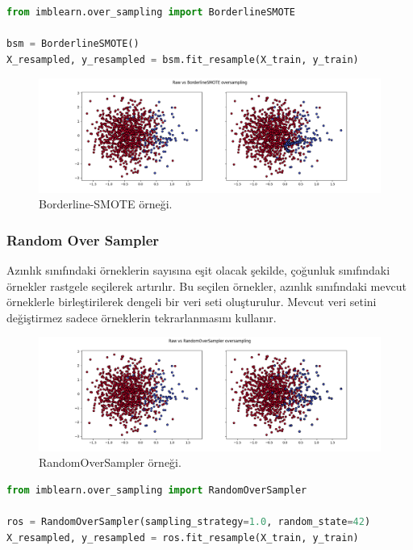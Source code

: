 \begin{lstlisting}[language=Python]
from imblearn.over_sampling import BorderlineSMOTE

bsm = BorderlineSMOTE()
X_resampled, y_resampled = bsm.fit_resample(X_train, y_train)
\end{lstlisting}

\begin{figure}[h]
    \centering
    \includegraphics[width=1\textwidth]{images/Raw vs BorderlineSMOTE oversampling.png}
    \caption{Borderline-SMOTE örneği.}
    \label{fig:enter-label}
\end{figure}

\subsubsection{Random Over Sampler}
Azınlık sınıfındaki örneklerin sayısına eşit olacak şekilde, çoğunluk sınıfındaki örnekler rastgele seçilerek artırılır. Bu seçilen örnekler, azınlık sınıfındaki mevcut örneklerle birleştirilerek dengeli bir veri seti oluşturulur. Mevcut veri setini değiştirmez sadece örneklerin tekrarlanmasını kullanır.

\begin{figure}[h]
    \centering
    \includegraphics[width=1\textwidth]{images/Raw vs RandomOverSampler oversampling.png}
    \caption{RandomOverSampler örneği.}
    \label{fig:enter-label}
\end{figure}

\begin{lstlisting}[language=Python]
from imblearn.over_sampling import RandomOverSampler

ros = RandomOverSampler(sampling_strategy=1.0, random_state=42)
X_resampled, y_resampled = ros.fit_resample(X_train, y_train)
\end{lstlisting}


